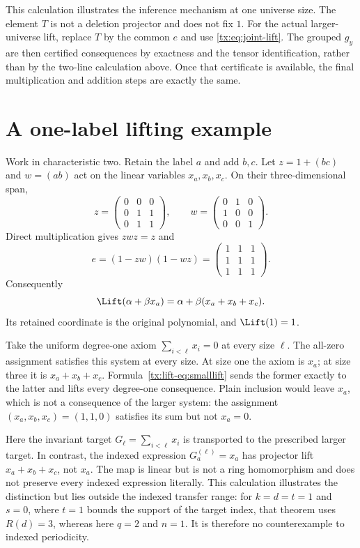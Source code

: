 This calculation illustrates the inference mechanism at one universe size.
The element $T$ is not a deletion projector and does not fix $1$.
For the actual larger-universe lift, replace $T$ by the common $e$
and use \eqref{tx:eq:joint-lift}. The grouped $g_y$ are then certified
consequences by exactness and the tensor identification, rather than
by the two-line calculation above. Once that certificate is available,
the final multiplication and addition steps are exactly the same.


\section{A one-label lifting example}\label{tx:lift-sec:small}
Work in characteristic two. Retain the label $a$ and add $b,c$.
Let $z=1+(bc)$ and $w=(ab)$ act on the linear variables
$x_a,x_b,x_c$. On their three-dimensional span,
\[
 z=\begin{pmatrix}0&0&0\\0&1&1\\0&1&1\end{pmatrix},\qquad
 w=\begin{pmatrix}0&1&0\\1&0&0\\0&0&1\end{pmatrix}.
\]
Direct multiplication gives $zwz=z$ and
\[
                       e=(1-zw)(1-wz)
                         =\begin{pmatrix}1&1&1\\1&1&1\\1&1&1\end{pmatrix}.
\]
Consequently
\begin{equation}\label{tx:lift-eq:smalllift}
                  \Lift(\alpha+\beta x_a)
                      =\alpha+\beta(x_a+x_b+x_c).
\end{equation}
Its retained coordinate is the original polynomial, and $\Lift(1)=1$.

Take the uniform degree-one axiom $\sum_{i<\ell}x_i=0$ at every size $\ell$.
The all-zero assignment satisfies this system at every size.
At size one the axiom is $x_a$; at size three it is $x_a+x_b+x_c$.
Formula~\eqref{tx:lift-eq:smalllift} sends the former exactly to the latter and
lifts every degree-one consequence. Plain inclusion would leave $x_a$,
which is not a consequence of the larger system: the assignment
$(x_a,x_b,x_c)=(1,1,0)$ satisfies its sum but not $x_a=0$.

Here the invariant target $G_\ell=\sum_{i<\ell}x_i$ is transported to
the prescribed larger target. In contrast, the indexed expression
$G_a^{(\ell)}=x_a$ has projector lift $x_a+x_b+x_c$, not $x_a$. The map
is linear but is not a ring homomorphism and does not preserve every
indexed expression literally. This calculation illustrates the distinction but lies outside the
indexed transfer range: for $k=d=t=1$ and $s=0$, where $t=1$ bounds
the support of the target index, that theorem uses
$R(d)=3$, whereas here $q=2$ and $n=1$. It is therefore no
counterexample to indexed periodicity.

